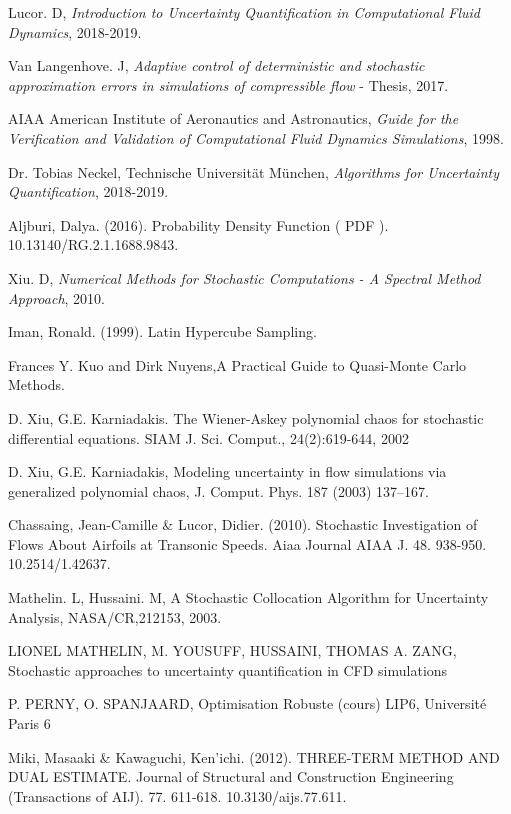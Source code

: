 \documentclass[11pt, a4paper, English]{report}
\begin{document}
\color{blue!40!black}\begin{thebibliography}{50}\color{black}

Lucor. D, \textit{Introduction to
Uncertainty Quantification
in Computational Fluid Dynamics},  2018-2019.

Van Langenhove. J, \textit{Adaptive control of deterministic and stochastic approximation errors in simulations of compressible flow} - Thesis, 2017.

AIAA American Institute of Aeronautics and Astronautics, \textit{Guide for the Verification and Validation of Computational Fluid Dynamics Simulations}, 1998.

Dr. Tobias Neckel, Technische Universität München, \textit{Algorithms for Uncertainty Quantification}, 2018-2019.

Aljburi, Dalya. (2016). Probability Density Function ( PDF ). 10.13140/RG.2.1.1688.9843.

Xiu. D, \textit{Numerical Methods for Stochastic Computations - A Spectral Method Approach}, 2010.

Iman, Ronald. (1999). Latin Hypercube Sampling. 

Frances Y. Kuo and Dirk Nuyens,A Practical Guide to Quasi-Monte Carlo Methods.

D. Xiu, G.E. Karniadakis. The Wiener-Askey polynomial chaos for stochastic differential equations. SIAM J. Sci. Comput., 24(2):619-644, 2002

D. Xiu, G.E. Karniadakis, Modeling uncertainty in flow simulations via generalized polynomial chaos, J. Comput. Phys. 187
(2003) 137–167.

Chassaing, Jean-Camille & Lucor, Didier. (2010). Stochastic Investigation of Flows About Airfoils at Transonic Speeds. Aiaa Journal  AIAA J. 48. 938-950. 10.2514/1.42637. 

Mathelin. L, Hussaini. M, A Stochastic Collocation Algorithm for Uncertainty Analysis, NASA/CR,212153,
2003.

LIONEL MATHELIN, M. YOUSUFF, HUSSAINI, THOMAS A. ZANG, Stochastic approaches to uncertainty quantification in CFD simulations

P. PERNY, O. SPANJAARD, Optimisation Robuste (cours) LIP6, Université Paris 6

Miki, Masaaki & Kawaguchi, Ken'ichi. (2012). THREE-TERM METHOD AND DUAL ESTIMATE. Journal of Structural and Construction Engineering (Transactions of AIJ). 77. 611-618. 10.3130/aijs.77.611.


\end{thebibliography}
\end{document}
